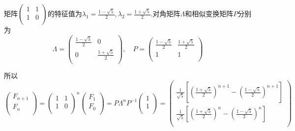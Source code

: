 \documentclass{article}
\begin{document}
\begin{homeworkProblem}
	矩阵$\left( \begin{matrix}
		1&		1\\
		1&		0\\
	\end{matrix} \right)$的特征值为$\displaystyle \lambda _1=\frac{1-\sqrt{5}}{2},\lambda _2=\frac{1+\sqrt{5}}{2}$.对角矩阵$\Lambda$和相似变换矩阵$P$分别为$$\Lambda =\left( \begin{matrix}
		\frac{1-\sqrt{5}}{2}&		0\\
		0&		\frac{1+\sqrt{5}}{2}\\
	\end{matrix} \right) ,\quad P=\left( \begin{matrix}
		\frac{1-\sqrt{5}}{2}&		\frac{1+\sqrt{5}}{2}\\
		1&		1\\
	\end{matrix} \right) $$
	
	所以$$\left( \begin{array}{c}
		F_{n+1}\\
		F_n\\
	\end{array} \right) =\left( \begin{matrix}
		1&		1\\
		1&		0\\
	\end{matrix} \right) ^n\left( \begin{array}{c}
		F_1\\
		F_0\\
	\end{array} \right) =P\Lambda ^nP^{-1}\left( \begin{array}{c}
		1\\
		1\\
	\end{array} \right) =\left( \begin{array}{c}
		\frac{1}{\sqrt{5}}\left[ \left( \frac{1+\sqrt{5}}{2} \right) ^{n+1}-\left( \frac{1-\sqrt{5}}{2} \right) ^{n+1} \right]\\
		\frac{1}{\sqrt{5}}\left[ \left( \frac{1+\sqrt{5}}{2} \right) ^n-\left( \frac{1-\sqrt{5}}{2} \right) ^n \right]\\
	\end{array} \right) $$
\end{homeworkProblem}

\pagebreak
\end{document}

